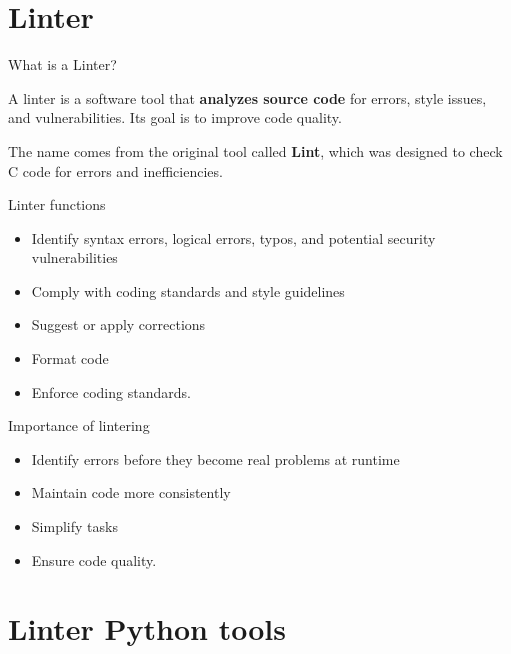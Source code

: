 
\section{Linter}

\begin{frame}[c]{What is a Linter?}
  \begin{definition}
    A linter is a software tool that \textbf{analyzes source code} for errors,
    style issues, and vulnerabilities. Its goal is to improve code quality.
  \end{definition}

  \vspace{\baselineskip}
  The name comes from the original tool called \textbf{Lint}, which was
  designed to check C code for errors and inefficiencies.
\end{frame}

\begin{frame}[c]{Linter functions}
  \begin{itemize}
    \item Identify syntax errors, logical errors, typos, and
      potential security vulnerabilities
    \pausa
    \item Comply with coding standards and style guidelines
    \pausa
    \item Suggest or apply corrections
    \pausa
    \item Format code
    \pausa
    \item Enforce coding standards.
  \end{itemize}
\end{frame}

\begin{frame}[c]{Importance of lintering}
  \begin{itemize}
    \item Identify errors before they become real problems at runtime
    \pausa
    \item Maintain code more consistently
    \pausa
    \item Simplify tasks
    \pausa
    \item Ensure code quality.
  \end{itemize}
\end{frame}

\section{Linter Python tools}

